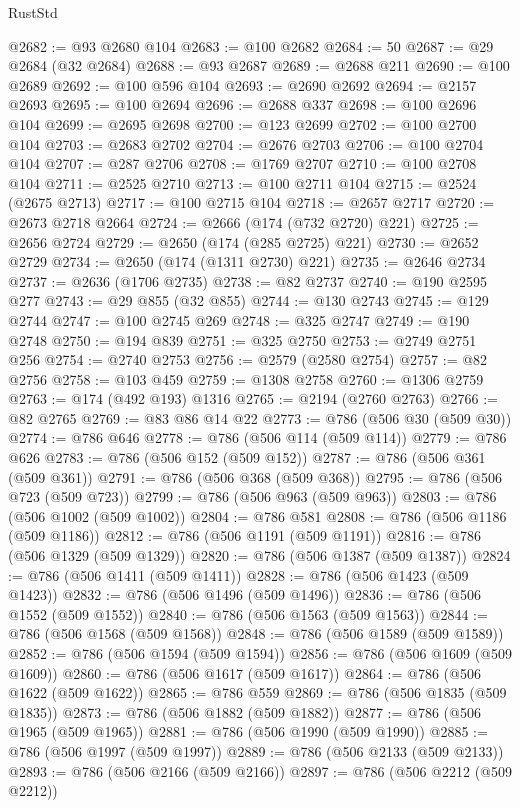 \begin{lexlean}{RustStd}
\begin{coremodule}
{\begin{coremodule}
{{{{{{{{{{{{{{{{{{{{{{{{{{{{{{{{{{{{{{{{{{{{{{{{{{{{{{{@2682 := @93 @2680 @104
@2683 := @100 @2682
@2684 := 50
@2687 := @29 @2684 (@32 @2684)
@2688 := @93 @2687
@2689 := @2688 @211
@2690 := @100 @2689
@2692 := @100 @596 @104
@2693 := @2690 @2692
@2694 := @2157 @2693
@2695 := @100 @2694
@2696 := @2688 @337
@2698 := @100 @2696 @104
@2699 := @2695 @2698
@2700 := @123 @2699
@2702 := @100 @2700 @104
@2703 := @2683 @2702
@2704 := @2676 @2703
@2706 := @100 @2704 @104
@2707 := @287 @2706
@2708 := @1769 @2707
@2710 := @100 @2708 @104
@2711 := @2525 @2710
@2713 := @100 @2711 @104
@2715 := @2524 (@2675 @2713)
@2717 := @100 @2715 @104
@2718 := @2657 @2717
@2720 := @2673 @2718 @2664
@2724 := @2666 (@174 (@732 @2720) @221)
@2725 := @2656 @2724
@2729 := @2650 (@174 (@285 @2725) @221)
@2730 := @2652 @2729
@2734 := @2650 (@174 (@1311 @2730) @221)
@2735 := @2646 @2734
@2737 := @2636 (@1706 @2735)
@2738 := @82 @2737
@2740 := @190 @2595 @277
@2743 := @29 @855 (@32 @855)
@2744 := @130 @2743
@2745 := @129 @2744
@2747 := @100 @2745 @269
@2748 := @325 @2747
@2749 := @190 @2748
@2750 := @194 @839
@2751 := @325 @2750
@2753 := @2749 @2751 @256
@2754 := @2740 @2753
@2756 := @2579 (@2580 @2754)
@2757 := @82 @2756
@2758 := @103 @459
@2759 := @1308 @2758
@2760 := @1306 @2759
@2763 := @174 (@492 @193) @1316
@2765 := @2194 (@2760 @2763)
@2766 := @82 @2765
@2769 := @83 @86 @14 @22
@2773 := @786 (@506 @30 (@509 @30))
@2774 := @786 @646
@2778 := @786 (@506 @114 (@509 @114))
@2779 := @786 @626
@2783 := @786 (@506 @152 (@509 @152))
@2787 := @786 (@506 @361 (@509 @361))
@2791 := @786 (@506 @368 (@509 @368))
@2795 := @786 (@506 @723 (@509 @723))
@2799 := @786 (@506 @963 (@509 @963))
@2803 := @786 (@506 @1002 (@509 @1002))
@2804 := @786 @581
@2808 := @786 (@506 @1186 (@509 @1186))
@2812 := @786 (@506 @1191 (@509 @1191))
@2816 := @786 (@506 @1329 (@509 @1329))
@2820 := @786 (@506 @1387 (@509 @1387))
@2824 := @786 (@506 @1411 (@509 @1411))
@2828 := @786 (@506 @1423 (@509 @1423))
@2832 := @786 (@506 @1496 (@509 @1496))
@2836 := @786 (@506 @1552 (@509 @1552))
@2840 := @786 (@506 @1563 (@509 @1563))
@2844 := @786 (@506 @1568 (@509 @1568))
@2848 := @786 (@506 @1589 (@509 @1589))
@2852 := @786 (@506 @1594 (@509 @1594))
@2856 := @786 (@506 @1609 (@509 @1609))
@2860 := @786 (@506 @1617 (@509 @1617))
@2864 := @786 (@506 @1622 (@509 @1622))
@2865 := @786 @559
@2869 := @786 (@506 @1835 (@509 @1835))
@2873 := @786 (@506 @1882 (@509 @1882))
@2877 := @786 (@506 @1965 (@509 @1965))
@2881 := @786 (@506 @1990 (@509 @1990))
@2885 := @786 (@506 @1997 (@509 @1997))
@2889 := @786 (@506 @2133 (@509 @2133))
@2893 := @786 (@506 @2166 (@509 @2166))
@2897 := @786 (@506 @2212 (@509 @2212))
}}}}}}}}}}}}}}}}}}}}}}}}}}}}}}}}}}}}}}}}}}}}}}}}}}}}}}}
\end{coremodule}}
\end{coremodule}
\end{lexlean}
